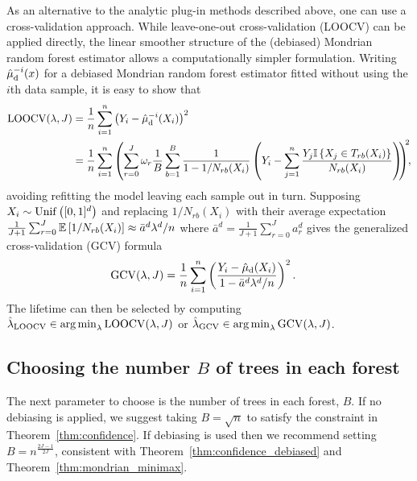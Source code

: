 As an alternative to the analytic plug-in methods described above, one can use
a cross-validation approach. While leave-one-out cross-validation (LOOCV) can
be applied directly, the linear smoother structure of the (debiased) Mondrian
random forest estimator allows a computationally simpler formulation. Writing
$\hat\mu_{\mathrm{d}}^{-i}(x)$ for a debiased Mondrian random forest estimator fitted
without using the $i$th data sample, it is easy to show that
%
\begin{align*}
  \operatorname{LOOCV}(\lambda, J)
  &=
  \frac{1}{n}
  \sum_{i=1}^{n}
  \left( Y_i - \hat\mu_{\mathrm{d}}^{-i}(X_i) \right)^2 \\
  &=
  \frac{1}{n}
  \sum_{i=1}^{n}
  \left(
    \sum_{r=0}^{J}
    \omega_r
    \frac{1}{B}
    \sum_{b=1}^{B}
    \frac{1}{1 - 1/N_{r b}(X_i)}
    \left( Y_i -
      \sum_{j=1}^{n}
      \frac{ Y_j \mathbb{I} \left\{ X_j \in T_{r b}(X_i) \right\}}
      {N_{r b}(X_i)}
    \right)
    \hspace*{-1mm}
  \right)^{\hspace*{-1mm}2}
  \hspace*{-1.2mm},
\end{align*}
%
avoiding refitting the model leaving each sample out in turn.
Supposing $X_i \sim \operatorname{Unif}\big([0,1]^d\big)$ and
replacing $1/N_{r b}(X_i)$ with their average expectation
$ \frac{1}{J+1} \sum_{r=0}^{J} \mathbb{E} \left[ 1/N_{r b}(X_i) \right]
\approx \bar a^d \lambda^d / n$
where $\bar a^d = \frac{1}{J+1} \sum_{r=0}^{J} a_r^d$
gives the generalized cross-validation (GCV) formula
%
\begin{align}
  \label{eq:gcv}
  \operatorname{GCV}(\lambda, J)
  &=
  \frac{1}{n}
  \sum_{i=1}^{n}
  \left(
    \frac{Y_i - \hat\mu_{\mathrm{d}}(X_i)}
    {1 - \bar a^d \lambda^d / n}
  \right)^2.
\end{align}
%
The lifetime can then be selected by computing
$\hat\lambda_{\operatorname{LOOCV}} \in \operatorname*{arg\,min}_\lambda \operatorname{LOOCV}(\lambda, J)$
or $\hat\lambda_{\operatorname{GCV}} \in \operatorname*{arg\,min}_\lambda \operatorname{GCV}(\lambda, J)$.

\subsection{Choosing the number \texorpdfstring{$B$}{B} of trees
in each forest}%

The next parameter to choose is the number of trees in each forest, $B$.
If no debiasing is applied, we suggest taking
$B = \sqrt{n}$ to satisfy the constraint in Theorem~\ref{thm:confidence}.
If debiasing is used then we recommend setting
$B = n^{\frac{2J-1}{2J}}$, consistent with Theorem~\ref{thm:confidence_debiased}
and Theorem~\ref{thm:mondrian_minimax}.

